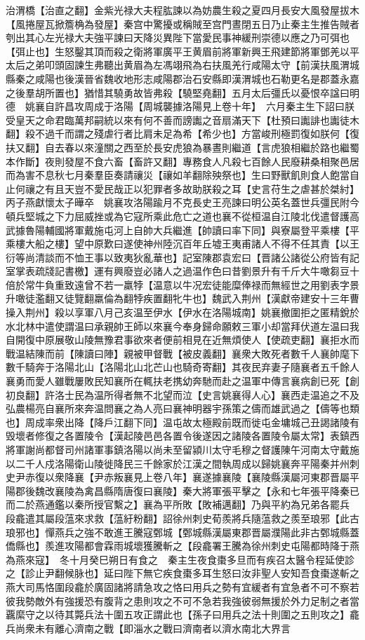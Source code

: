 治渭橋【治直之翻】金紫光禄大夫程肱諫以為妨農生殺之夏四月長安大風發屋拔木【風捲屋瓦掀簷桷為發屋】秦宫中驚擾或稱賊至宫門晝閉五日乃止秦主生推告賊者刳出其心左光禄大夫強平諫曰天降災異陛下當愛民事神緩刑崇德以應之乃可弭也【弭止也】生怒鑿其頂而殺之衛將軍廣平王黄眉前將軍新興王飛建節將軍鄧羌以平太后之弟叩頭固諫生弗聽出黄眉為左馮翊飛為右扶風羌行咸陽太守【前漢扶風渭城縣秦之咸陽也後漢晉省魏收地形志咸陽郡治石安縣即漢渭城也石勒更名是郡蓋永嘉之後羣胡所置也】猶惜其驍勇故皆弗殺【驍堅堯翻】五月太后彊氏以憂恨卒諡曰明德　姚襄自許昌攻周成于洛陽【周城襲據洛陽見上卷十年】　六月秦主生下詔曰朕受皇天之命君臨萬邦嗣統以來有何不善而謗讟之音扇滿天下【杜預曰讟誹也讟徒木翻】殺不過千而謂之殘虐行者比肩未足為希【希少也】方當峻刑極罰復如朕何【復扶又翻】自去春以來潼關之西至於長安虎狼為暴晝則繼道【言虎狼相繼於路也繼蜀本作斷】夜則發屋不食六畜【畜許又翻】專務食人凡殺七百餘人民廢耕桑相聚邑居而為害不息秋七月秦羣臣奏請禳災【禳如羊翻除殃祭也】生曰野獸飢則食人飽當自止何禳之有且天豈不愛民哉正以犯罪者多故助朕殺之耳【史言苻生之虐甚於桀紂】　丙子燕獻懷太子曄卒　姚襄攻洛陽踰月不克長史王亮諫曰明公英名蓋世兵彊民附今頓兵堅城之下力屈威挫或為它寇所乘此危亡之道也襄不從桓温自江陵北伐遣督護高武據魯陽輔國將軍戴施屯河上自帥大兵繼進【帥讀曰率下同】與寮屬登平乘樓【平乘樓大船之樓】望中原歎曰遂使神州陸沉百年丘墟王夷甫諸人不得不任其責【以王衍等尚清談而不恤王事以致夷狄亂華也】記室陳郡袁宏曰【晋諸公諸從公府皆有記室掌表疏牋記書檄】運有興廢豈必諸人之過温作色曰昔劉景升有千斤大牛噉芻豆十倍於常牛負重致遠曾不若一羸㹀【温意以牛况宏徒能糜俸禄而無經世之用劉表字景升噉徒濫翻又徒覽翻羸倫為翻㹀疾置翻牝牛也】魏武入荆州【漢獻帝建安十三年曹操入荆州】殺以享軍八月己亥温至伊水【伊水在洛陽城南】姚襄撤圍拒之匿精銳於水北林中遣使謂温曰承親帥王師以來襄今奉身歸命願敕三軍小却當拜伏道左温曰我自開復中原展敬山陵無豫君事欲來者便前相見在近無煩使人【使疏吏翻】襄拒水而戰温結陳而前【陳讀曰陣】親被甲督戰【被皮義翻】襄衆大敗死者數千人襄帥麾下數千騎奔于洛陽北山【洛陽北山北芒山也騎奇寄翻】其夜民弃妻子隨襄者五千餘人襄勇而愛人雖戰屢敗民知襄所在輒扶老携幼奔馳而赴之温軍中傳言襄病創已死【創初良翻】許洛士民為温所得者無不北望而泣【史言姚襄得人心】襄西走温追之不及弘農楊亮自襄所來奔温問襄之為人亮曰襄神明器宇孫策之儔而雄武過之【儔等也類也】周成率衆出降【降戶江翻下同】温屯故太極殿前既而徙屯金墉城己丑謁諸陵有毁壞者修復之各置陵令【漢起陵邑邑各置令後遂因之諸陵各置陵令屬太常】表鎮西將軍謝尚都督司州諸軍事鎮洛陽以尚未至留潁川太守毛穆之督護陳午河南太守戴施以二千人戍洛陽衛山陵徙降民三千餘家於江漢之間執周成以歸姚襄奔平陽秦并州刺史尹赤復以衆降襄【尹赤叛襄見上卷八年】襄遂據襄陵【襄陵縣漢屬河東郡晋屬平陽郡後魏改襄陵為禽昌縣隋唐復曰襄陵】秦大將軍張平擊之【永和七年張平降秦已而二於燕通鑑以秦所授官繫之】襄為平所敗【敗補邁翻】乃與平約為兄弟各罷兵　段龕遣其屬段蕰來求救【蕰紆粉翻】詔徐州刺史荀羨將兵隨蕰救之羨至琅邪【此古琅邪也】憚燕兵之強不敢進王騰寇鄄城【鄄城縣漢屬東郡晋屬濮陽此非古鄄城縣蓋僑縣也】羨進攻陽都會霖雨城壞獲騰斬之【段龕署王騰為徐州刺史屯陽都時降于燕為燕來寇】　冬十月癸巳朔日有食之　秦主生夜食棗多旦而有疾召太醫令程延使診之【診止尹翻候脉也】延曰陛下無它疾食棗多耳生怒曰汝非聖人安知吾食棗遂斬之　燕大司馬恪圍段龕於廣固諸將請急攻之恪曰用兵之勢有宜緩者有宜急者不可不察若彼我勢敵外有強援恐有腹背之患則攻之不可不急若我強彼弱無援於外力足制之者當覊縻守之以待其斃兵法十圍五攻正謂此也【孫子曰用兵之法十則圍之五則攻之】龕兵尚衆未有離心濟南之戰【即淄水之戰曰濟南者以濟水南北大界言